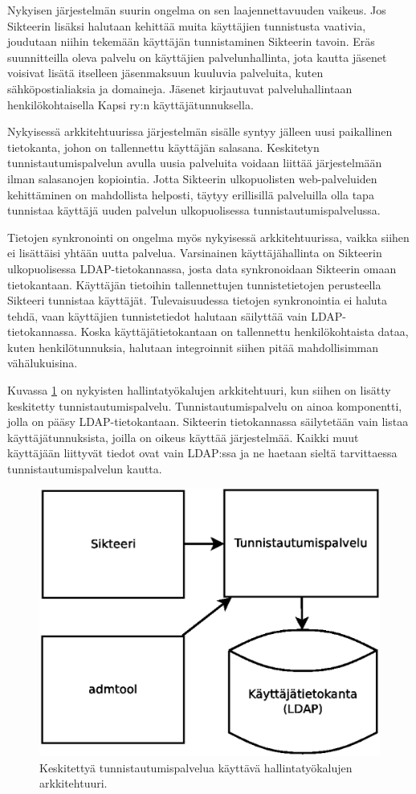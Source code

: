 Nykyisen järjestelmän suurin ongelma on sen laajennettavuuden vaikeus. Jos Sikteerin lisäksi halutaan kehittää muita käyttäjien tunnistusta vaativia, joudutaan niihin tekemään käyttäjän tunnistaminen Sikteerin tavoin. Eräs suunnitteilla oleva palvelu on käyttäjien palvelunhallinta, jota kautta jäsenet voisivat lisätä itselleen jäsenmaksuun kuuluvia palveluita, kuten sähköpostialiaksia ja domaineja. Jäsenet kirjautuvat palveluhallintaan henkilökohtaisella Kapsi ry:n käyttäjätunnuksella.

Nykyisessä arkkitehtuurissa järjestelmän sisälle syntyy jälleen uusi paikallinen tietokanta, johon on tallennettu käyttäjän salasana. Keskitetyn tunnistautumispalvelun avulla uusia palveluita voidaan liittää järjestelmään ilman salasanojen kopiointia. Jotta Sikteerin ulkopuolisten web-palveluiden kehittäminen on mahdollista helposti, täytyy erillisillä palveluilla olla tapa tunnistaa käyttäjä uuden palvelun ulkopuolisessa tunnistautumispalvelussa.

Tietojen synkronointi on ongelma myös nykyisessä arkkitehtuurissa, vaikka siihen ei lisättäisi yhtään uutta palvelua. Varsinainen käyttäjähallinta on Sikteerin ulkopuolisessa LDAP-tie\-to\-kan\-nas\-sa, josta data synkronoidaan Sikteerin omaan tietokantaan. Käyttäjän tietoihin tallennettujen tunnistetietojen perusteella Sikteeri tunnistaa käyttäjät. Tulevaisuudessa tietojen synkronointia ei haluta tehdä, vaan käyttäjien tunnistetiedot halutaan säilyttää vain LDAP-tietokannassa. Koska käyttäjätietokantaan on tallennettu henkilökohtaista dataa, kuten henkilötunnuksia, halutaan integroinnit siihen pitää mahdollisimman vähälukuisina.

Kuvassa \ref{kapsi_nykyinen_uusi} on nykyisten hallintatyökalujen arkkitehtuuri, kun siihen on lisätty keskitetty tunnistautumispalvelu. Tunnistautumispalvelu on ainoa komponentti, jolla on pääsy LDAP-tietokantaan. Sikteerin tietokannassa säilytetään vain listaa käyttäjätunnuksista, joilla on oikeus käyttää järjestelmää. Kaikki muut käyttäjään liittyvät tiedot ovat vain LDAP:ssa ja ne haetaan sieltä tarvittaessa tunnistautumispalvelun kautta.

\begin{figure}[ht]
\centering
\includegraphics[width=.6\textwidth]{toteutus/muutostarve/kapsi_uusi.eps}
\caption{Keskitettyä tunnistautumispalvelua käyttävä hallintatyökalujen arkkitehtuuri.}%
\label{kapsi_nykyinen_uusi}
\end{figure}

